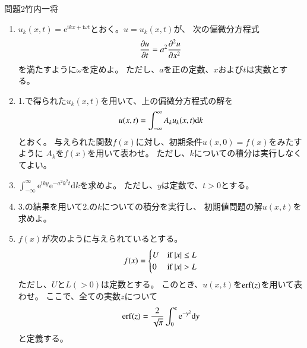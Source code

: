 \documentclass[fleqn]{jbook}
\newcommand{\erf}{\mathop{\rm erf}\nolimits} %
\newcommand{\prt}[2]{\frac{\partial #1}{\partial #2}}   %
\newcommand{\prts}[3]{\frac{\partial^{#3} #1}{\partial {#2}^{#3}}}   %
\begin{document}
\begin{question}{問題2}{竹内一将}
\begin{enumerate}
\item
$u_k(x,t)=\mathrm{e}^{\mathrm{i} kx+\mathrm{i}\omega t}$とおく。$u=u_k(x,t)$が、
次の偏微分方程式
\begin{eqnarray}
 \prt{u}{t} = a^2 \prts{u}{x}{2}  \notag
\end{eqnarray}
を満たすように$\omega$を定めよ。
ただし、$a$を正の定数、$x$および$t$は実数とする。
\item
1.で得られた$u_k(x,t)$を用いて、上の偏微分方程式の解を
\begin{eqnarray}
 u(x,t) = \int_{-\infty}^\infty A_k u_k(x,t)\mathrm{d} k  \notag
\end{eqnarray}
とおく。
与えられた関数$f(x)$に対し、初期条件$u(x,0)=f(x)$をみたすように
$A_k$を$f(x)$を用いて表わせ。
ただし、$k$についての積分は実行しなくてよい。
\item
$\int_{-\infty}^\infty \mathrm{e}^{\mathrm{i} ky} \mathrm{e}^{-a^2 k^2 t} \mathrm{d} k$を求めよ。
ただし、$y$は定数で、$t>0$とする。
\item
3.の結果を用いて2.の$k$についての積分を実行し、
初期値問題の解$u(x,t)$を求めよ。
\item
$f(x)$が次のように与えられているとする。
\begin{eqnarray}
 f(x) = \begin{cases}
 U & \text{if $|x| \leq L$}  \\
 0 & \text{if $|x| >L$}
 \end{cases}  \notag
\end{eqnarray}
ただし、$U$と$L(>0)$は定数とする。
このとき、$u(x,t)$を$\erf (z)$を用いて表わせ。
ここで、全ての実数$z$について
\begin{eqnarray}
 \erf (z) = \frac{2}{\sqrt{\pi}} \int_0^z \mathrm{e}^{-y^2} \mathrm{d} y
  \notag
\end{eqnarray}
と定義する。
\end{enumerate}
\end{question}
\end{document}
